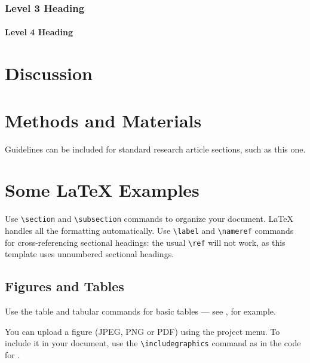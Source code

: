 \documentclass[9pt,lineno]{elife}
\begin{document}
\subsubsection{Level 3 Heading}

\lipsum[5]

\paragraph{Level 4 Heading}
\lipsum[7]

\section{Discussion}

\lipsum[9]

\section{Methods and Materials}

Guidelines can be included for standard research article sections, such as this one. 

\lipsum[3]

\section{Some \LaTeX{} Examples}
\label{sec:examples}

Use \verb|\section| and \verb|\subsection| commands to organize your document. \LaTeX{} handles all the formatting automatically. Use \verb|\label| and \verb|\nameref| commands for cross-referencing sectional headings: the usual \verb|\ref| will not work, as this template uses unnumbered sectional headings.

\subsection{Figures and Tables}

Use the table and tabular commands for basic tables --- see , for example. 

You can upload a figure (JPEG, PNG or PDF) using the project menu. To include it in your document, use the \verb|\includegraphics| command as in the code for . 
\end{document}
